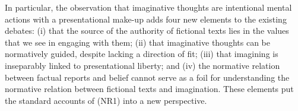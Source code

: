 In particular, the observation that imaginative thoughts are intentional mental actions with a presentational make-up adds four new elements to the existing debates: (i) that the source of the authority of fictional texts lies in the values that we see in engaging with them; (ii) that imaginative thoughts can be normatively guided, despite lacking a direction of fit; (iii) that imagining is inseparably linked to presentational liberty; and (iv) the normative relation between factual reports and belief cannot serve as a foil for understanding the normative relation between fictional texts and imagination. These elements put the standard accounts of (NR1) into a new perspective. 



